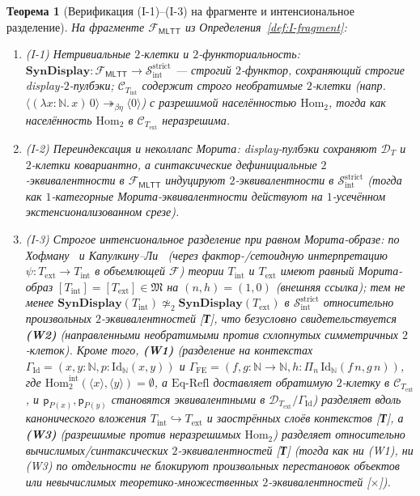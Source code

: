 \documentclass[11pt]{article}
\theoremstyle{plain}
\newtheorem{theorem}{Теорема}[section]
\theoremstyle{definition}
\newcommand{\cF}{\mathcal{F}}
\newcommand{\cC}{\mathcal{C}}
\newcommand{\cD}{\mathcal{D}}
\newcommand{\fM}{\mathfrak{M}}
\newcommand{\Hom}{\mathrm{Hom}}
\newcommand{\MLTT}{\mathsf{MLTT}}
\begin{document}
\begin{theorem}[Верификация (I-1)--(I-3) на фрагменте и интенсиональное разделение]\label{thm:I-fragment}
На фрагменте $\mathcal{F}_{\MLTT}$ из Определения~\ref{def:I-fragment}:
\begin{enumerate}[nosep,label=(\roman*)]
\item \emph{\textup{(I-1)} Нетривиальные $2$-клетки и $2$-функториальность}: $\mathbf{SynDisplay} : \mathcal{F}_{\MLTT} \to \mathcal{S}_{\mathrm{int}}^{\mathrm{strict}}$ — строгий $2$-функтор, сохраняющий строгие display-$2$-пулбэки; $\cC_{T_{\mathrm{int}}}$ содержит строго необратимые $2$-клетки (напр.\ $\langle (\lambda x:\mathbb{N}.\,x)\,0 \rangle \twoheadrightarrow_{\beta\eta} \langle 0 \rangle$) с разрешимой населённостью $\Hom_2$, тогда как населённость $\Hom_2$ в $\cC_{T_{\mathrm{ext}}}$ неразрешима.
\item \emph{\textup{(I-2)} Переиндексация и неколлапс Морита}: display-пулбэки сохраняют $\cD_T$ и $2$-клетки ковариантно, а синтаксические дефинициальные $2$-эквивалентности в $\mathcal{F}_{\MLTT}$ индуцируют $2$-эквивалентности в $\mathcal{S}_{\mathrm{int}}^{\mathrm{strict}}$ (тогда как $1$-категорные Морита-эквивалентности действуют на $1$-усечённом экстенсионализованном срезе).
\item \emph{\textup{(I-3)} Строгое интенсиональное разделение при равном Морита-образе}: по Хофману~\cite{Hofmann1995} и Капулкину--Ли~\cite{KapulkinLi2025} (через фактор-/сетоидную интерпретацию $\psi : T_{\mathrm{ext}} \to T_{\mathrm{int}}$ в объемлющей $\cF$) теории $T_{\mathrm{int}}$ и $T_{\mathrm{ext}}$ имеют равный Морита-образ $[T_{\mathrm{int}}] = [T_{\mathrm{ext}}] \in \fM$ на $(n, h) = (1, 0)$ (внешняя ссылка); тем не менее $\mathbf{SynDisplay}(T_{\mathrm{int}}) \not\simeq_2 \mathbf{SynDisplay}(T_{\mathrm{ext}})$ в $\mathcal{S}_{\mathrm{int}}^{\mathrm{strict}}$ относительно \emph{произвольных} $2$-эквивалентностей \textup{[\textbf{Т}]}, что безусловно свидетельствуется \textbf{(W2)} (направленными необратимыми против схлопнутых симметричных $2$-клеток). Кроме того, \textbf{(W1)} (разделение на контекстах $\Gamma_{\mathrm{Id}} = (x,y:\mathbb{N}, p:\mathrm{Id}_{\mathbb{N}}(x,y))$ и $\Gamma_{\mathrm{FE}} = (f,g:\mathbb{N}\to\mathbb{N}, h:\Pi_n\,\mathrm{Id}_{\mathbb{N}}(f\,n,g\,n))$, где $\Hom_2^{\mathrm{int}}(\langle x\rangle,\langle y\rangle)=\emptyset$, а $\text{Eq-Refl}$ доставляет обратимую $2$-клетку в $\cC_{T_{\mathrm{ext}}}$, и $\mathsf{p}_{P(x)}, \mathsf{p}_{P(y)}$ становятся эквивалентными в $\cD_{T_{\mathrm{ext}}}/\Gamma_{\mathrm{Id}}$) разделяет вдоль канонического вложения $T_{\mathrm{int}} \hookrightarrow T_{\mathrm{ext}}$ и заострённых слоёв контекстов \textup{[\textbf{Т}]}, а \textbf{(W3)} (разрешимые против неразрешимых $\Hom_2$) разделяет относительно вычислимых/синтаксических $2$-эквивалентностей \textup{[\textbf{Т}]} (тогда как ни (W1), ни (W3) по отдельности не блокируют произвольных перестановок объектов или невычислимых теоретико-множественных $2$-эквивалентностей \textup{[\textbf{$\times$}]}).
\end{enumerate}
\end{theorem}
\end{document}
